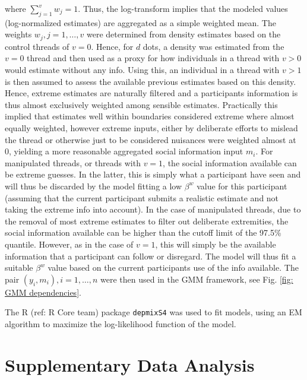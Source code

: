 \documentclass[9pt,twoside,lineno]{pnas-new}
\begin{document}
where $\sum_{j=1}^v w_j = 1$. Thus, the log-transform implies that the modeled values (log-normalized estimates) are aggregated as a simple weighted mean. The weights $w_j, j=1,\dots,v$ were determined from density estimates based on the control threads of $v=0$. Hence, for $d$ dots, a density was estimated from the $v=0$ thread and then used as a proxy for how individuals in a thread with $v>0$ would estimate without any info. Using this, an individual in a thread with $v>1$ is then assumed to assess the available previous estimates based on this density. Hence, extreme estimates are naturally filtered and a participants information is thus almost exclusively weighted among sensible estimates. Practically this implied that estimates well within boundaries considered extreme where almost equally weighted, however extreme inputs, either by deliberate efforts to mislead the thread or otherwise just to be considered nuisances were weighted almost at 0, yielding a more reasonable aggregated social information input $m_i$. For manipulated threads, or threads with $v=1$, the social information available can be extreme guesses. In the latter, this is simply what a participant have seen and will thus be discarded by the model fitting a low $\beta^w$ value for this participant (assuming that the current participant submits a realistic estimate and not taking the extreme info into account). In the case of manipulated threads, due to the removal of most extreme estimates to filter out deliberate extremities, the social information available can be higher than the cutoff limit of the 97.5\% quantile. However, as in the case of $v=1$, this will simply be the available information that a participant can follow or disregard. The model will thus fit a suitable $\beta^w$ value based on the current participants use of the info available. The pair $(y_i,m_i), i=1,\dots,n$ were then used in the GMM framework, see Fig. \ref{fig: GMM dependencies}.

The R (ref: R Core team) package \texttt{depmixS4} was used to fit models, using an EM algorithm to maximize the log-likelihood function of the model. 

\section*{Supplementary Data Analysis}
\end{document}
